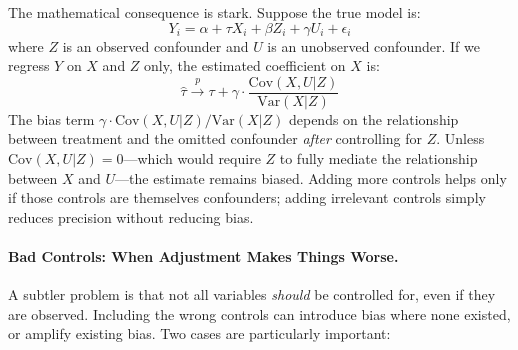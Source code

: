 The mathematical consequence is stark.
Suppose the true model is:
\begin{equation}
    Y_i = \alpha + \tau X_i + \beta Z_i + \gamma U_i + \epsilon_i
\end{equation}
where $Z$ is an observed confounder and $U$ is an unobserved confounder.
If we regress $Y$ on $X$ and $Z$ only, the estimated coefficient on $X$ is:
\begin{equation}
    \hat{\tau} \xrightarrow{p} \tau + \gamma \cdot \frac{\text{Cov}(X, U | Z)}{\text{Var}(X | Z)}
\end{equation}
The bias term $\gamma \cdot \text{Cov}(X, U | Z) / \text{Var}(X | Z)$ depends on the relationship between treatment and the omitted confounder \emph{after} controlling for $Z$.
Unless $\text{Cov}(X, U | Z) = 0$---which would require $Z$ to fully mediate the relationship between $X$ and $U$---the estimate remains biased.
Adding more controls helps only if those controls are themselves confounders; adding irrelevant controls simply reduces precision without reducing bias.


\paragraph{Bad Controls: When Adjustment Makes Things Worse.}
A subtler problem is that not all variables \emph{should} be controlled for, even if they are observed.
Including the wrong controls can introduce bias where none existed, or amplify existing bias.
Two cases are particularly important:

